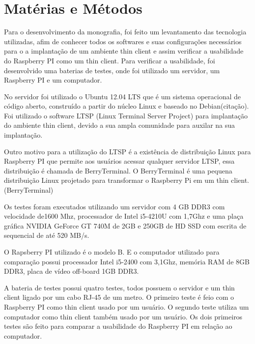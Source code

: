 \documentclass[
	12pt,				%
	openright,			%
	twoside,			%
	a4paper,			%
	chapter=TITLE,		%
	english,			%
	brazil				%
	]{abntex2}
\begin{document}

\part{Matérias e Métodos}

Para o desenvolvimento da monografia, foi feito um levantamento das tecnologia utilizadas, afim de conhecer todos os softwares e suas configurações necessários para o a implantação de um ambiente thin client e assim verificar a usabilidade do Raspberry PI como um thin client. Para verificar a usabilidade, foi desenvolvido uma baterias de testes, onde foi utilizado um servidor, um Raspberry PI e um computador. 

No servidor foi utilizado o Ubuntu 12.04 LTS que é um sistema operacional de código aberto, construído a partir do núcleo Linux e baseado no Debian(citação). Foi utilizado o software LTSP (Linux Terminal Server Project) para implantação do ambiente thin client, devido a sua ampla comunidade para auxilar na sua implantação. 

Outro motivo para a utilização do LTSP é a existência de distribuição Linux para Raspberry PI que permite aos usuários acessar qualquer servidor LTSP, essa distribuição é chamada de BerryTerminal. O BerryTerminal é uma pequena distribuição Linux projetado para transformar o Raspberry Pi em um thin client. (BerryTerminal)

Os testes foram executados utilizando um servidor com 4 GB DDR3 com velocidade de1600 Mhz, processador de Intel i5-4210U com 1,7Ghz e uma plaça gráfica NVIDIA GeForce GT 740M de 2GB e 250GB de HD SSD com escrita de sequencial de até 520 MB/s. 
	
O Rapsberry PI utilizado é o modelo B. E o computador utilizado para comparação possui processador Intel i5-2400 com 3,1Ghz, memória RAM de 8GB DDR3, placa de vídeo off-board 1GB DDR3.

A bateria de testes possui quatro testes, todos possuem o servidor e um thin client ligado por um cabo RJ-45 de um metro. O primeiro teste é feio com o Raspberry PI como thin client usado por um usuário.  O segundo teste utiliza um computador como thin client também usado por um usuário. Os dois primeiros testes são feito para comparar a usabilidade do Raspberry PI  em relação ao computador. 
\end{document}

